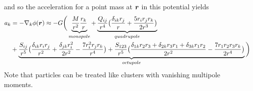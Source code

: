 and so the acceleration for a point mass at $\boldsymbol{r}$ in this potential yields
\begin{align}
\label{ch02_grav02_eq011}
a_{k} &= - \nabla_{k} \phi(\boldsymbol{r}) \approx - G \bigg(
\underbrace{ \frac{M}{r^{2}} \frac{r_{k}}{r} }_{monopole}+ 
\underbrace{ \frac{Q_{i j}}{r^{4}}
\big( \frac{\delta_{i k} r_{j} }{r} + \frac{5 r_{i} r_{j} r_{k} }{2r^{3}} \big)
}_{quadrupole} \nonumber \\
&+ \underbrace{ \frac{S_{i j}}{r^{5}}
\big( \frac{ \delta_{i k} r_{i} r_{j} }{r^{2}}
+ \frac{ \delta_{j k} r_{i}^{2} }{2 r^{2} }
- \frac{7 r_{i}^{2} r_{j} r_{k} }{r^{4} } \big) 
 + \frac{S_{1 2 3}}{r^{5} }
\big( \frac{\delta_{1 k} r_{2} r_{3} + \delta_{2 k} r_{3} r_{1} + \delta_{3 k} r_{1} r_{2}}{2 r^{2}} 
- \frac{7 r_{1} r_{2} r_{3} r_{k} }{2 r^{4}}\big) 
}_{octupole}
\bigg)
\end{align}
Note that particles can be treated like clusters with vanishing multipole moments.

